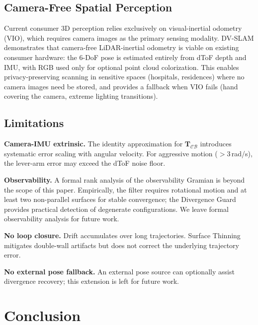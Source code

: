 \documentclass[journal]{IEEEtran}
\begin{document}
\subsection{Camera-Free Spatial Perception}

Current consumer 3D perception relies exclusively on visual-inertial odometry~\cite{campos2021orbslam3,qin2018vins} (VIO), which requires camera images as the primary sensing modality. DV-SLAM demonstrates that camera-free LiDAR-inertial odometry is viable on existing consumer hardware: the 6-DoF pose is estimated entirely from dToF depth and IMU, with RGB used only for optional point cloud colorization.
This enables privacy-preserving scanning in sensitive spaces (hospitals, residences) where no camera images need be stored, and provides a fallback when VIO fails (hand covering the camera, extreme lighting transitions).

\subsection{Limitations}
\label{sec:limitations}

\textbf{Camera-IMU extrinsic.} The identity approximation for $\mathbf{T}_{\mathcal{C}\mathcal{B}}$ introduces systematic error scaling with angular velocity. For aggressive motion ($>$3\,rad/s), the lever-arm error may exceed the dToF noise floor.

\textbf{Observability.} A formal rank analysis of the observability Gramian is beyond the scope of this paper. Empirically, the filter requires rotational motion and at least two non-parallel surfaces for stable convergence; the Divergence Guard provides practical detection of degenerate configurations. We leave formal observability analysis for future work.

\textbf{No loop closure.} Drift accumulates over long trajectories. Surface Thinning mitigates double-wall artifacts but does not correct the underlying trajectory error.

\textbf{No external pose fallback.} An external pose source can optionally assist divergence recovery; this extension is left for future work.

\section{Conclusion}
\label{sec:conclusion}
\end{document}
